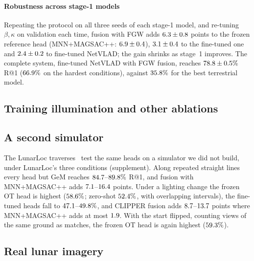 \paragraph*{Robustness across stage-1 models}
Repeating the protocol on all three seeds of each stage-1 model, and re-tuning $\beta,\kappa$ on
validation each time, fusion with FGW adds $6.3\pm0.8$ points to the frozen reference
head (MNN+MAGSAC++: $6.9\pm0.4$), $3.1\pm0.4$ to the fine-tuned one and
$2.4\pm0.2$ to fine-tuned NetVLAD; the gain shrinks as stage~1 improves. The complete
system, fine-tuned NetVLAD with FGW fusion, reaches $78.8\pm0.5\%$ R@1
($66.9\%$ on the hardest conditions), against $35.8\%$ for the best terrestrial model.


\subsection{Training illumination and other ablations}\label{sec:ablation}



\subsection{A second simulator}\label{sec:lunarloc}
The LunarLoc traverses~\cite{thomas2026lunarloc} test the same heads on a simulator we did not build, under
LunarLoc's three conditions (supplement). Along
repeated straight lines every head but GeM reaches $84.7$--$89.8\%$ R@1, and fusion with MNN+MAGSAC++
adds $7.1$--$16.4$ points. Under a lighting change the frozen OT head is highest
($58.6\%$; zero-shot $52.4\%$, with overlapping intervals), the fine-tuned heads fall to
$47.1$--$49.8\%$, and CLIPPER fusion adds $8.7$--$13.7$ points where
MNN+MAGSAC++ adds at most $1.9$. With the start flipped, counting views of the same ground as
matches, the frozen OT head is again highest ($59.3\%$).

\subsection{Real lunar imagery}\label{sec:real}





